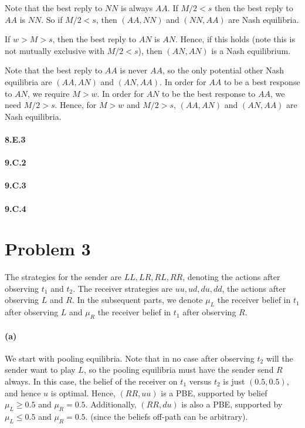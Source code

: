 \documentclass[10pt,letter]{article}
\begin{document}
Note that the best reply to $NN$ is always $AA$. If $M/2 < s$ then the best reply to $AA$ is $NN$. So if $M/2 < s$, then $(AA, NN)$ and $(NN, AA)$ are Nash equilibria.

If $w > M > s$, then the best reply to $AN$ is $AN$. Hence, if this holds (note this is not mutually exclusive with $M/2 < s$), then $(AN, AN)$ is a Nash equilibrium.

Note that the best reply to $AA$ is never $AA$, so the only potential other Nash equilibria are $(AA, AN)$ and $(AN, AA)$. In order for $AA$ to be a best response to $AN$, we require $M > w$. In order for $AN$ to be the best response to $AA$, we need $M/2 > s$. Hence, for $M>w$ and $M/2 > s$, $(AA,AN)$ and $(AN,AA)$ are Nash equilibria.

\paragraph*{8.E.3}


\paragraph*{9.C.2}
\paragraph*{9.C.3}
\paragraph*{9.C.4}
\section*{Problem 3}
The strategies for the sender are $LL, LR, RL, RR$, denoting the actions after observing $t_1$ and $t_2$. The receiver strategies are $uu, ud, du, dd$, the actions after observing $L$ and $R$. In the subsequent parts, we denote $\mu_L$ the receiver belief in $t_1$ after observing $L$ and $\mu_R$ the receiver belief in $t_1$ after observing $R$.
\paragraph*{(a)}
We start with pooling equilibria. Note that in no case after observing $t_2$ will the sender want to play $L$, so the pooling equilibria must have the sender send $R$ always. In this case, the belief of the receiver on $t_1$ versus $t_2$ is just $(0.5, 0.5)$, and hence $u$ is optimal. Hence, $(RR, uu)$ is a PBE, supported by belief $\mu_L \ge 0.5$ and $\mu_R = 0.5$. Additionally, $(RR, du)$  is also a PBE, supported by $\mu_L \le 0.5$ and $\mu_R = 0.5$. (since the beliefs off-path can be arbitrary).
\end{document}

